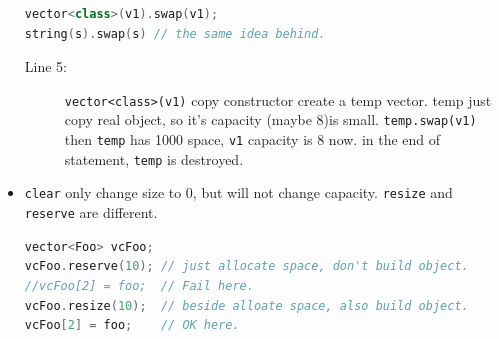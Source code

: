 \documentclass[a4paper,11pt,twoside]{book}
\begin{document}
\begin{itemize}
\begin{lstlisting}[frame=single, language=c++]
vector<class>(v1).swap(v1);
string(s).swap(s) // the same idea behind.
\end{lstlisting}
	\begin{description}
		\item[Line 5:] \texttt{vector<class>(v1)} copy constructor create a temp vector. temp just copy real object, so it's capacity (maybe 8)is small. \texttt{temp.swap(v1)} then \texttt{temp} has 1000 space,  \texttt{v1} capacity is 8 now. in the end of statement, \texttt{temp} is destroyed.
	\end{description}
	
	\item \texttt{clear} only change size to 0, but will not change capacity. \texttt{resize} and \texttt{reserve} are different.
\begin{lstlisting}[frame=single, language=c++]
vector<Foo> vcFoo;
vcFoo.reserve(10); // just allocate space, don't build object.
//vcFoo[2] = foo;  // Fail here. 
vcFoo.resize(10);  // beside alloate space, also build object.
vcFoo[2] = foo;    // OK here.
\end{lstlisting}	
	
\end{itemize}
\end{document}
